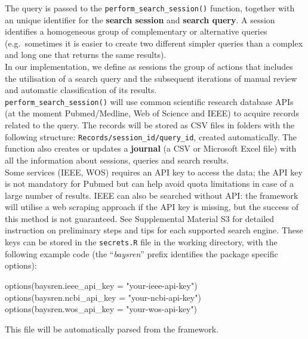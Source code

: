\documentclass[
]{article}
\newenvironment{Shaded}{\begin{snugshade}}{\end{snugshade}}
\newcommand{\AttributeTok}[1]{\textcolor[rgb]{0.77,0.63,0.00}{#1}}
\newcommand{\FunctionTok}[1]{\textcolor[rgb]{0.00,0.00,0.00}{#1}}
\newcommand{\NormalTok}[1]{#1}
\newcommand{\StringTok}[1]{\textcolor[rgb]{0.31,0.60,0.02}{#1}}
\begin{document}
The query is passed to the \texttt{perform\_search\_session()} function,
together with an unique identifier for the \textbf{search session} and
\textbf{search query}. A session identifies a homogeneous group of
complementary or alternative queries (e.g.~sometimes it is easier to
create two different simpler queries than a complex and long one that
returns the same results).\\
In our implementation, we define as sessions the group of actions that
includes the utilisation of a search query and the subsequent iterations
of manual review and automatic classification of its results.\\

\texttt{perform\_search\_session()} will use common scientific research
database APIs (at the moment Pubmed/Medline, Web of Science and IEEE) to
acquire records related to the query. The records will be stored as CSV
files in folders with the following structure:
\texttt{Records/session\_id/query\_id}, created automatically. The
function also creates or updates a \textbf{journal} (a CSV or Microsoft
Excel file) with all the information about sessions, queries and search
results.\\
Some services (IEEE, WOS) requires an API key to access the data; the
API key is not mandatory for Pubmed but can help avoid quota limitations
in case of a large number of results. IEEE can also be searched without
API: the framework will utilise a web scraping approach if the API key
is missing, but the success of this method is not guaranteed. See
Supplemental Material S3 for detailed instruction on preliminary steps
and tips for each supported search engine. These keys can be stored in
the \texttt{secrets.R} file in the working directory, with the following
example code (the ``\emph{baysren}'' prefix identifies the package
specific options):

\begin{Shaded}
\begin{Highlighting}[]
\FunctionTok{options}\NormalTok{(}\AttributeTok{baysren.ieee\_api\_key =} \StringTok{"your{-}ieee{-}api{-}key"}\NormalTok{)}
\FunctionTok{options}\NormalTok{(}\AttributeTok{baysren.ncbi\_api\_key =} \StringTok{"your{-}ncbi{-}api{-}key"}\NormalTok{)}
\FunctionTok{options}\NormalTok{(}\AttributeTok{baysren.wos\_api\_key =} \StringTok{"your{-}wos{-}api{-}key"}\NormalTok{)}
\end{Highlighting}
\end{Shaded}

This file will be automatically parsed from the framework.
\end{document}
